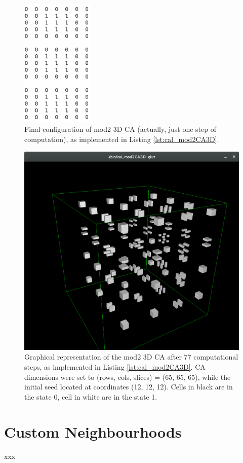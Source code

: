 \begin{figure}
  \begin{center}
    \includegraphics[width=3.5cm]{./images/OpenCAL/mod2_LAST}
    \caption{Final configuration of mod2 3D CA (actually, just one step of computation), as implemented in Listing \ref{lst:cal_mod2CA3D}.}
    \label{fig:mod2_LAST}
  \end{center}
\end{figure}


\begin{figure}
  \begin{center}
    \includegraphics[width=12cm]{./images/OpenCAL/mod23DCA-glut}
    \caption{Graphical representation of the mod2 3D CA after 77 computational steps, as implemented in Listing \ref{lst:cal_mod2CA3D}. CA dimensions were set to (rows, cols, slices) = (65, 65, 65), while the initial seed located at coordinates (12, 12, 12). Cells in black are in the state 0, cell in white are in the state 1.}
    \label{fig:mod2_LAST}
  \end{center}
\end{figure}


\section{Custom Neighbourhoods}
xxx
